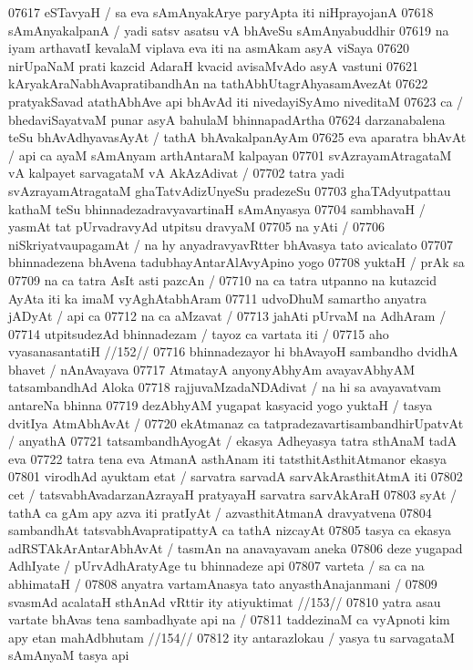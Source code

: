 07617 eSTavyaH / sa eva sAmAnyakArye paryApta iti niHprayojanA
07618 sAmAnyakalpanA / yadi satsv asatsu vA bhAveSu sAmAnyabuddhir  
07619 na iyam arthavatI kevalaM viplava eva iti na asmAkam asyA viSaya
07620 nirUpaNaM prati kazcid AdaraH kvacid avisaMvAdo asyA vastuni 
07621 kAryakAraNabhAvapratibandhAn na tathAbhUtagrAhyasamAvezAt  
07622 pratyakSavad atathAbhAve api bhAvAd iti nivedayiSyAmo niveditaM  
07623 ca / bhedaviSayatvaM punar asyA bahulaM bhinnapadArtha
07624 darzanabalena teSu bhAvAdhyavasAyAt / tathA bhAvakalpanAyAm 
07625 eva aparatra bhAvAt / api ca ayaM sAmAnyam arthAntaraM kalpayan  
07701 svAzrayamAtragataM vA kalpayet sarvagataM vA AkAzAdivat / 
07702 tatra yadi svAzrayamAtragataM ghaTatvAdizUnyeSu pradezeSu  
07703 ghaTAdyutpattau kathaM teSu bhinnadezadravyavartinaH sAmAnyasya  
07704 sambhavaH / yasmAt tat pUrvadravyAd utpitsu dravyaM 
07705 	na yAti / 
07706 niSkriyatvaupagamAt / na hy anyadravyavRtter bhAvasya tato avicalato 
07707 bhinnadezena bhAvena tadubhayAntarAlAvyApino yogo 
07708 yuktaH / prAk sa
07709 	na ca tatra AsIt asti pazcAn /  
07710 na ca tatra utpanno na kutazcid AyAta iti ka imaM vyAghAtabhAram 
07711 udvoDhuM samartho anyatra jADyAt / api ca 
07712 	na ca aMzavat /  
07713 	jahAti pUrvaM na AdhAram /  
07714 utpitsudezAd bhinnadezam / tayoz ca vartata iti / 
07715 	aho vyasanasantatiH //152//  
07716 bhinnadezayor hi bhAvayoH sambandho dvidhA bhavet / nAnAvayava 
07717 AtmatayA anyonyAbhyAm avayavAbhyAM tatsambandhAd  Aloka
07718 rajjuvaMzadaNDAdivat / na hi sa avayavatvam antareNa bhinna  
07719 dezAbhyAM yugapat kasyacid yogo yuktaH / tasya dvitIya AtmAbhAvAt /
07720 ekAtmanaz ca tatpradezavartisambandhirUpatvAt / anyathA  
07721 tatsambandhAyogAt / ekasya Adheyasya tatra sthAnaM tadA eva  
07722 tatra tena eva AtmanA asthAnam iti tatsthitAsthitAtmanor ekasya  
07801 virodhAd ayuktam etat / sarvatra sarvadA sarvAkArasthitAtmA iti
07802 cet / tatsvabhAvadarzanAzrayaH pratyayaH sarvatra sarvAkAraH 
07803 syAt / tathA ca gAm apy azva iti pratIyAt / azvasthitAtmanA dravyatvena
07804 sambandhAt tatsvabhAvapratipattyA ca tathA nizcayAt 
07805 tasya ca ekasya adRSTAkArAntarAbhAvAt / tasmAn na anavayavam aneka
07806 deze yugapad AdhIyate / pUrvAdhAratyAge tu bhinnadeze api 
07807 varteta / sa ca na abhimataH /  
07808 	anyatra vartamAnasya tato anyasthAnajanmani /  
07809 	svasmAd acalataH sthAnAd vRttir ity atiyuktimat //153//  
07810 	yatra asau vartate bhAvas tena sambadhyate api na /  
07811 	taddezinaM ca vyApnoti kim apy etan mahAdbhutam //154//  
07812 ity antarazlokau / yasya tu sarvagataM sAmAnyaM tasya api  
